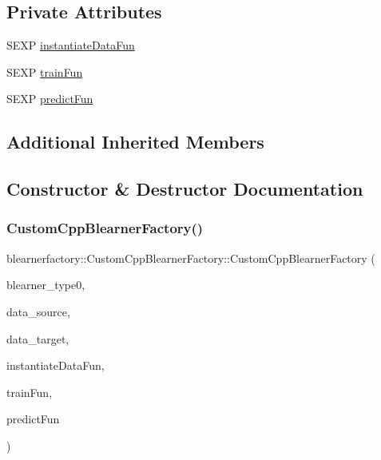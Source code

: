 \subsection*{Private Attributes}
\begin{DoxyCompactItemize}
\item 
S\+E\+XP \mbox{\hyperlink{classblearnerfactory_1_1_custom_cpp_blearner_factory_aa9264dd28d1046cef3d38d531e065bc0}{instantiate\+Data\+Fun}}
\item 
S\+E\+XP \mbox{\hyperlink{classblearnerfactory_1_1_custom_cpp_blearner_factory_aad89a4d126b8b3e5ac0b6bca98074193}{train\+Fun}}
\item 
S\+E\+XP \mbox{\hyperlink{classblearnerfactory_1_1_custom_cpp_blearner_factory_aa17d2f6ba9b64a6908548b017242d24e}{predict\+Fun}}
\end{DoxyCompactItemize}
\subsection*{Additional Inherited Members}


\subsection{Constructor \& Destructor Documentation}
\mbox{\label{classblearnerfactory_1_1_custom_cpp_blearner_factory_a390de0fb001434b3252e5f723c55d7b3}} 
\subsubsection{\texorpdfstring{Custom\+Cpp\+Blearner\+Factory()}{CustomCppBlearnerFactory()}}
{\footnotesize\ttfamily blearnerfactory\+::\+Custom\+Cpp\+Blearner\+Factory\+::\+Custom\+Cpp\+Blearner\+Factory (\begin{DoxyParamCaption}\item[{const std\+::string \&}]{blearner\+\_\+type0,  }\item[{\mbox{\hyperlink{classdata_1_1_data}{data\+::\+Data}} $\ast$}]{data\+\_\+source,  }\item[{\mbox{\hyperlink{classdata_1_1_data}{data\+::\+Data}} $\ast$}]{data\+\_\+target,  }\item[{S\+E\+XP}]{instantiate\+Data\+Fun,  }\item[{S\+E\+XP}]{train\+Fun,  }\item[{S\+E\+XP}]{predict\+Fun }\end{DoxyParamCaption})}

